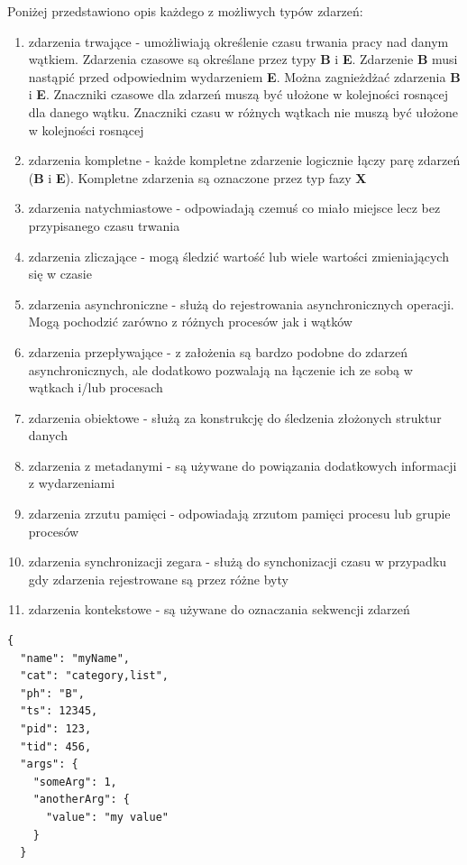 \documentclass[polish, twoside, 12pt]{mwart}
\begin{document}
Poniżej przedstawiono opis każdego z możliwych typów zdarzeń:

\begin{enumerate}
  \item zdarzenia trwające - umożliwiają określenie czasu trwania pracy nad danym wątkiem. Zdarzenia czasowe są określane przez typy \textbf{B} i \textbf{E}. Zdarzenie \textbf{B} musi nastąpić przed odpowiednim wydarzeniem \textbf{E}. Można zagnieżdżać zdarzenia \textbf{B} i \textbf{E}. Znaczniki czasowe dla zdarzeń muszą być ułożone w kolejności rosnącej dla danego wątku. Znaczniki czasu w różnych wątkach nie muszą być ułożone w kolejności rosnącej
  \item zdarzenia kompletne - każde kompletne zdarzenie logicznie łączy parę zdarzeń (\textbf{B} i \textbf{E}). Kompletne zdarzenia są oznaczone przez typ fazy \textbf{X}
  \item zdarzenia natychmiastowe - odpowiadają czemuś co miało miejsce lecz bez przypisanego czasu trwania
  \item zdarzenia zliczające - mogą śledzić wartość lub wiele wartości zmieniających się w czasie
  \item zdarzenia asynchroniczne - służą do rejestrowania asynchronicznych operacji. Mogą pochodzić zarówno z różnych procesów jak i wątków
  \item zdarzenia przepływające - z założenia są bardzo podobne do zdarzeń asynchronicznych, ale dodatkowo pozwalają na łączenie ich ze sobą w wątkach i/lub procesach
  \item zdarzenia obiektowe - służą za konstrukcję do śledzenia złożonych struktur danych
  \item zdarzenia z metadanymi - są używane do powiązania dodatkowych informacji z wydarzeniami
  \item zdarzenia zrzutu pamięci - odpowiadają zrzutom pamięci procesu lub grupie procesów
  \item zdarzenia synchronizacji zegara - służą do synchonizacji czasu w przypadku gdy zdarzenia rejestrowane są przez różne byty
  \item zdarzenia kontekstowe - są używane do oznaczania sekwencji zdarzeń
\end{enumerate}

\begin{lstlisting}[caption=Przykładowe zdarzenie]
{
  "name": "myName",
  "cat": "category,list",
  "ph": "B",
  "ts": 12345,
  "pid": 123,
  "tid": 456,
  "args": {
    "someArg": 1,
    "anotherArg": {
      "value": "my value"
    }
  }
\end{lstlisting}
\end{document}
